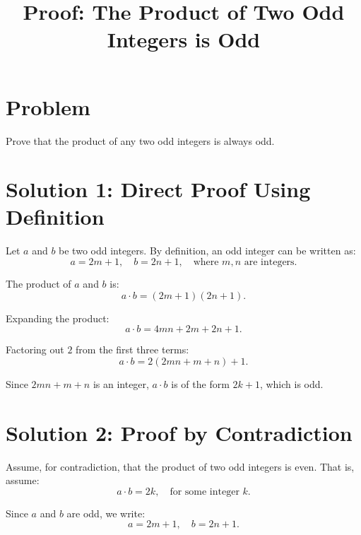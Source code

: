 \documentclass{article}
\begin{document}
\title{Proof: The Product of Two Odd Integers is Odd}
\author{}
\date{}
\maketitle

\section*{Problem}
Prove that the product of any two odd integers is always odd.

\section*{Solution 1: Direct Proof Using Definition}
Let $a$ and $b$ be two odd integers. By definition, an odd integer can be written as:
\begin{equation}
    a = 2m + 1, \quad b = 2n + 1, \quad \text{where } m, n \text{ are integers}.
\end{equation}

The product of $a$ and $b$ is:
\begin{equation}
    a \cdot b = (2m + 1)(2n + 1).
\end{equation}

Expanding the product:
\begin{equation}
    a \cdot b = 4mn + 2m + 2n + 1.
\end{equation}

Factoring out $2$ from the first three terms:
\begin{equation}
    a \cdot b = 2(2mn + m + n) + 1.
\end{equation}

Since $2mn + m + n$ is an integer, $a \cdot b$ is of the form $2k + 1$, which is odd.

\section*{Solution 2: Proof by Contradiction}
Assume, for contradiction, that the product of two odd integers is even. That is, assume:
\begin{equation}
    a \cdot b = 2k, \quad \text{for some integer } k.
\end{equation}

Since $a$ and $b$ are odd, we write:
\begin{equation}
    a = 2m + 1, \quad b = 2n + 1.
\end{equation}
\end{document}
